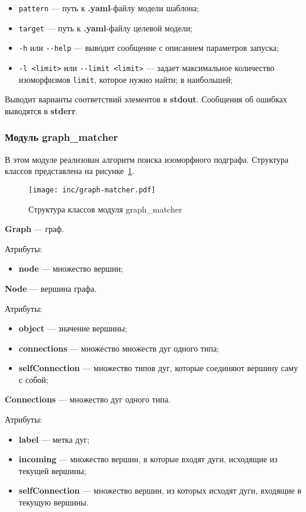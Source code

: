 \begin{itemize}
\item \verb;pattern; --- путь к \textbf{.yaml}-файлу модели шаблона;
\item \verb;target; --- путь к \textbf{.yaml}-файлу целевой модели;
\item \verb;-h; или \verb;--help; --- выводит сообщение с описанием параметров
запуска;
\item \verb;-l <limit>; или \verb;--limit <limit>; --- задает максимальное
количество изоморфизмов \verb;limit;, которое нужно найти;
в наибольшей;
\end{itemize}

Выводит варианты соответствий элементов в \textbf{stdout}.
Сообщения об ошибках выводятся в \textbf{stderr}.

\subsubsection{Модуль graph\_matcher}

В этом модуле реализован алгоритм поиска изоморфного подграфа.
Структура классов представлена на рисунке~\ref{fig:graph-matcher}.

\begin{figure}[!ht]
\centering
\texttt{[image: inc/graph-matcher.pdf]}
\caption{Структура классов модуля graph\_matcher}
\label{fig:graph-matcher}
\end{figure}

\textbf{Graph} --- граф.

Атрибуты:
\begin{itemize}
\item \textbf{node} --- множество вершин;
\end{itemize}

\textbf{Node} --- вершина графа.

Атрибуты:
\begin{itemize}
\item \textbf{object} --- значение вершины;
\item \textbf{connections} --- множество множеств дуг одного типа;
\item \textbf{selfConnection} --- множество типов дуг, которые соединяют вершину саму с собой;
\end{itemize}

\textbf{Connections} --- множество дуг одного типа.

Атрибуты:
\begin{itemize}
\item \textbf{label} --- метка дуг;
\item \textbf{incoming} --- множество вершин, в которые входят дуги, исходящие из текущей вершины;
\item \textbf{selfConnection} --- множество вершин, из которых исходят дуги, входящие в текущую вершины.
\end{itemize}

